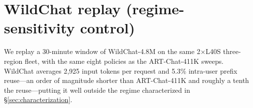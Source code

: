 \documentclass{article}
\begin{document}
\newpage





\appendix

\section{WildChat replay (regime-sensitivity control)}
\label{app:wildchat}

We replay a 30-minute window of WildChat-4.8M \citep{wildchat2024} on the
same 2$\times$L40S three-region fleet, with the same eight policies as the
ART-Chat-411K sweeps. WildChat averages 2{,}925 input tokens per request and
5.3\% intra-user prefix reuse---an order of magnitude shorter than ART-Chat-411K
and roughly a tenth the reuse---putting it well outside the regime
characterized in \S\ref{sec:characterization}.
\end{document}
